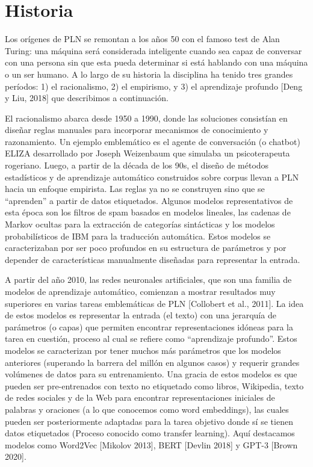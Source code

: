 \section{Historia}

Los orígenes de PLN se remontan a los años 50 con el famoso test de Alan Turing: una máquina será considerada inteligente cuando sea capaz de conversar con una persona sin que esta pueda determinar si está hablando con una máquina o un ser humano. A lo largo de su historia la disciplina ha tenido tres grandes períodos: 1) el racionalismo, 2) el empirismo, y 3) el aprendizaje profundo [Deng y Liu, 2018] que describimos a continuación.

El racionalismo abarca desde 1950 a 1990, donde las soluciones consistían en diseñar reglas manuales para incorporar mecanismos de conocimiento y razonamiento. Un ejemplo emblemático es el agente de conversación (o chatbot) ELIZA desarrollado por Joseph Weizenbaum que simulaba  un psicoterapeuta rogeriano. Luego, a partir de la década de los 90s, el diseño de métodos estadísticos y de aprendizaje automático construidos sobre corpus llevan a PLN hacia un enfoque empirista. Las reglas ya no se construyen sino que se “aprenden” a partir de datos etiquetados.  Algunos modelos representativos de esta época son los filtros de spam basados en modelos lineales, las cadenas de Markov ocultas para la extracción de categorías sintácticas y los modelos probabilísticos de IBM para la traducción automática. Estos modelos se caracterizaban por ser poco profundos en su estructura de parámetros y por depender de características manualmente diseñadas para representar la entrada.

A partir del año 2010, las redes neuronales artificiales, que son una familia de modelos de aprendizaje automático, comienzan a mostrar resultados muy superiores en varias tareas emblemáticas de PLN [Collobert et al., 2011]. La idea de estos modelos es representar la entrada (el texto) con una jerarquía de parámetros (o capas) que permiten encontrar representaciones idóneas para la tarea en cuestión, proceso al cual se refiere como “aprendizaje profundo”. Estos modelos se caracterizan por tener muchos más parámetros que los modelos anteriores (superando la barrera del millón en algunos casos) y requerir grandes volúmenes de datos para su entrenamiento. Una gracia de estos modelos es que pueden ser pre-entrenados con texto no etiquetado como libros, Wikipedia, texto de redes sociales y de la Web para encontrar representaciones iniciales de palabras y oraciones (a lo que conocemos como word embeddings),  las cuales pueden ser posteriormente adaptadas para la tarea objetivo donde sí se tienen datos etiquetados (Proceso conocido como transfer learning). Aquí destacamos modelos como Word2Vec [Mikolov 2013], BERT  [Devlin 2018] y GPT-3  [Brown 2020].

